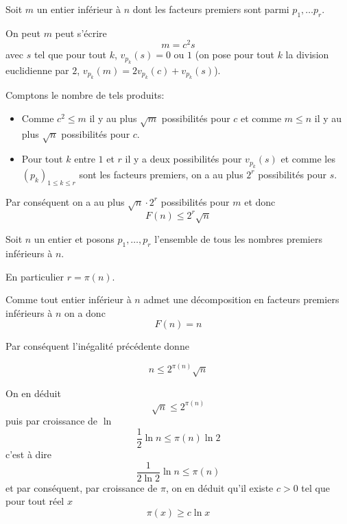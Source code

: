 \begin{sol}
Soit $m$ un entier inférieur à $n$ dont les facteurs premiers sont parmi $p_1, \ldots p_r$.

On peut $m$ peut s'écrire
$$ m = c^2 s$$
avec $s$ tel que pour tout $k$, $v_{p_k}(s) = 0 \text{ ou } 1$ (on pose pour tout $k$ la division euclidienne par $2$, $v_{p_k}(m) = 2 v_{p_k}(c) + v_{p_k}(s)$).

Comptons le nombre de tels produits:
\begin{itemize}
    \item Comme $c^2 \le m$ il y au plus $\sqrt m$ possibilités pour $c$ et comme $m \le n$ il y au plus $\sqrt n$ possibilités pour $c$.
    \item Pour tout $k$ entre $1$ et $r$ il y a deux possibilités pour $v_{p_k}(s)$ et comme les $(p_k)_{1 \le k \le r}$ sont les facteurs premiers, on a au plus $2^r$ possibilités pour $s$.
\end{itemize}

Par conséquent on a au plus $\sqrt n \cdot 2^r$ possibilités pour $m$ et donc
$$\boxed{F(n) \le 2^r \sqrt n}$$

Soit $n$ un entier et posons $p_1,\ldots,p_r$ l'ensemble de tous les nombres premiers inférieurs à $n$.

En particulier $r = \pi(n)$.

Comme tout entier inférieur à $n$ admet une décomposition en facteurs premiers inférieurs à $n$ on a donc
$$F(n) = n$$

Par conséquent l'inégalité précédente donne

$$n \le 2^{\pi(n)}\sqrt n$$

On en déduit 
$$\sqrt n \le 2^{\pi(n)}$$
puis par croissance de $\ln$ 
$$\frac{1}{2} \ln n \le \pi(n) \ln 2$$
c'est à dire
$$\frac{1}{2 \ln 2} \ln n \le \pi(n)$$
et par conséquent, par croissance de $\pi$, on en déduit qu'il existe $c>0$ tel que pour tout réel $x$
$$\boxed{\pi(x) \ge c \ln x}$$
\end{sol}


